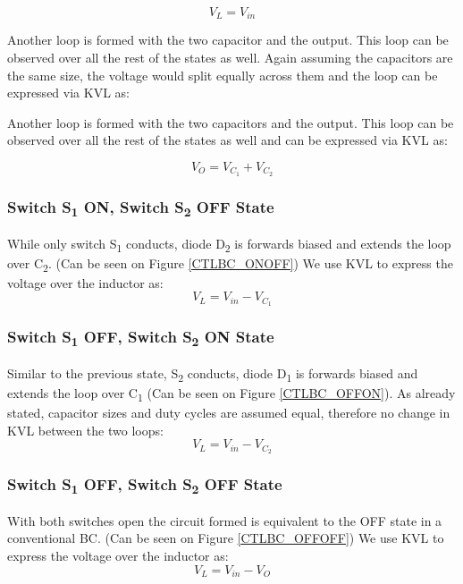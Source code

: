 \begin{equation}
	V_{L}=V_{in}
	\label{eq:CTLBC_KVL_ONON}
\end{equation}

Another loop is formed with the two capacitor and the output. This loop can be observed over all the rest of the states as well. Again assuming the capacitors are the same size, the voltage would split equally across them and the loop can be expressed via KVL as: 

Another loop is formed with the two capacitors and the output. This loop can be observed over all the rest of the states as well and can be expressed via KVL as: 

\begin{equation}
	V_O=V_{C_1}+V_{C_2}
	\label{eq:CTLBC_KVL_ONON2}
\end{equation}


\subsubsection{Switch S\textsubscript{1} ON, Switch S\textsubscript{2} OFF State}
While only switch S\textsubscript{1} conducts, diode D\textsubscript{2} is forwards biased and extends the loop over C\textsubscript{2}. (Can be seen on Figure \ref{CTLBC_ONOFF}) We use KVL to express the voltage over the inductor as: 
\begin{equation}
	V_{L}=V_{in}-V_{C_1}
	\label{eq:CTLBC_KVL_ONOFF}
\end{equation}
 
\subsubsection{Switch S\textsubscript{1} OFF, Switch S\textsubscript{2} ON State}
Similar to the previous state, S\textsubscript{2} conducts, diode D\textsubscript{1} is forwards biased and extends the loop over C\textsubscript{1} (Can be seen on Figure \ref{CTLBC_OFFON}). As already stated, capacitor sizes and duty cycles are assumed equal, therefore no change in KVL between the two loops: 
\begin{equation}
	V_{L}=V_{in}-V_{C_2}
	\label{eq:CTLBC_KVL_OFFON}
\end{equation}

\subsubsection{Switch S\textsubscript{1} OFF, Switch S\textsubscript{2} OFF State}
With both switches open the circuit formed is equivalent to the OFF state in a conventional BC. (Can be seen on Figure \ref{CTLBC_OFFOFF}) We use KVL to express the voltage over the inductor as: 
\begin{equation}
	V_{L}=V_{in}-V_{O}
	\label{eq:CTLBC_KVL_OFFOFF}
\end{equation}


